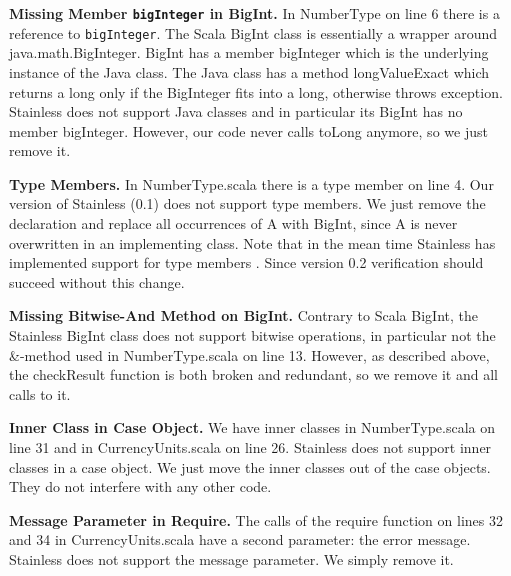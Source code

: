 \documentclass[runningheads]{llncs}
\renewcommand{\paragraph}{\textbf}%
\begin{document}
\paragraph{Missing Member \texttt{bigInteger} in BigInt.} In NumberType
on line 6 there is a reference to \texttt{bigInteger}. The Scala
BigInt class is essentially a wrapper around
java.math.BigInteger. BigInt has a member bigInteger which is the
underlying instance of the Java class. The Java class has a method
longValueExact which returns a long only if the BigInteger fits into a
long, otherwise throws exception. Stainless does not support Java
classes and in particular its BigInt has no member
bigInteger. However, our code never calls toLong anymore, so we just
remove it.

\paragraph{Type Members.} In NumberType.scala there is a type member
on line 4. Our version of Stainless (0.1) does not support type
members. We just remove the declaration and replace all occurrences of
A with BigInt, since A is never overwritten in an implementing class.
Note that in the mean time Stainless has implemented support for type
members \cite{Stainless:pull470}.  Since version 0.2 verification
should succeed without this change.


\paragraph{Missing Bitwise-And Method on BigInt.} Contrary to Scala
BigInt, the Stainless BigInt class does not support bitwise
operations, in particular not the \&-method used in NumberType.scala
on line 13. However, as described above, the checkResult function is
both broken and redundant, so we remove it and all calls to it.

\paragraph{Inner Class in Case Object.} We have inner classes in
NumberType.scala on line 31 and in CurrencyUnits.scala on line
26. Stainless does not support inner classes in a case object. We just
move the inner classes out of the case objects. They do not interfere
with any other code.

\paragraph{Message Parameter in Require.} The calls of the require
function on lines 32 and 34 in CurrencyUnits.scala have a second
parameter: the error message. Stainless does not support the message
parameter. We simply remove it.
\end{document}
